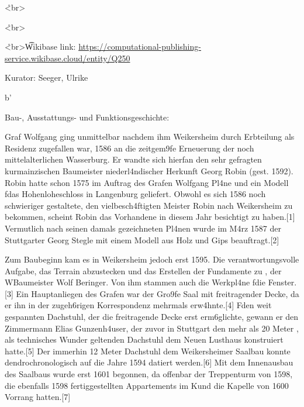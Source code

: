 \documentclass[
  letterpaper,
]{book}
\begin{document}
\r<br\textgreater{}

\r<br\textgreater{}

\r<br\textgreater{}\t
Wikibase link:
\url{https://computational-publishing-service.wikibase.cloud/entity/Q250}

Kurator: Seeger, Ulrike

b'

Bau-, Ausstattungs- und Funktionsgeschichte:

Graf Wolfgang ging unmittelbar nachdem ihm Weikersheim durch Erbteilung
als Residenz zugefallen war, 1586 an die zeitgem\x9fe
Erneuerung der noch mittelalterlichen Wasserburg. Er wandte sich
hierf\xbcr an den sehr gefragten kurmainzischen Baumeister
niederl\xa4ndischer Herkunft Georg Robin (gest. 1592). Robin hatte
schon 1575 im Auftrag des Grafen Wolfgang Pl\xa4ne und ein Modell
f\xbcr das Hohenloheschloss in Langenburg geliefert. Obwohl es sich
1586 noch schwieriger gestaltete, den vielbesch\xa4ftigten Meister
Robin nach Weikersheim zu bekommen, scheint Robin das Vorhandene in
diesem Jahr besichtigt zu haben.{[}1{]} Vermutlich nach seinen damals
gezeichneten Pl\xa4nen wurde im M\xa4rz 1587 der Stuttgarter
Georg Stegle mit einem Modell aus Holz und Gips beauftragt.{[}2{]}

Zum Baubeginn kam es in Weikersheim jedoch erst 1595. Die
verantwortungsvolle Aufgabe, das Terrain abzustecken und das Erstellen
der Fundamente zu \xbcberwachen, \xbcbernahm der
W\xbcrzburger Baumeister Wolf Beringer. Von ihm stammen auch die
Werkpl\xa4ne f\xbcr die Fenster.{[}3{]} Ein Hauptanliegen des
Grafen war der Gro\x9fe Saal mit freitragender Decke, da er ihn in
der zugeh\xb6rigen Korrespondenz mehrmals erw\xa4hnte.{[}4{]}
F\xbcr den weit gespannten Dachstuhl, der die freitragende Decke
erst erm\xb6glichte, gewann er den Zimmermann Elias
Gunzenh\xa4user, der zuvor in Stuttgart den mehr als 20 Meter
\xbcberspannenden, als technisches Wunder geltenden Dachstuhl
\xbcber dem Neuen Lusthaus konstruiert hatte.{[}5{]} Der immerhin 12
Meter \xbcberspannende Dachstuhl \xbcber dem Weikersheimer
Saalbau konnte dendrochronologisch auf die Jahre 1594
datiert werden.{[}6{]} Mit dem Innenausbau des Saalbaus wurde erst 1601
begonnen, da offenbar der Treppenturm von 1598, die ebenfalls 1598
fertiggestellten Appartements im K\xbcchenbau und die Kapelle von
1600 Vorrang hatten.{[}7{]}
\end{document}
